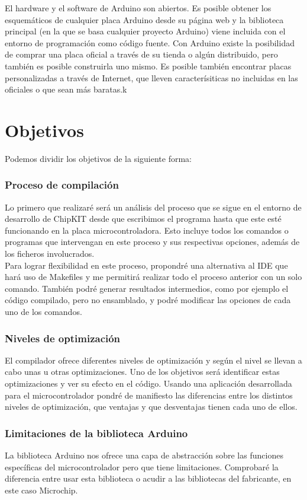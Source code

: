 El hardware y el software de Arduino son abiertos. Es posible obtener los esquemáticos de cualquier placa Arduino desde su página web y la biblioteca principal (en la que se basa cualquier proyecto Arduino) viene incluida con el entorno de programación como código fuente. Con Arduino existe la posibilidad de comprar una placa oficial a través de su tienda o algún distribuido, pero también es posible construirla uno mismo. Es posible también encontrar placas personalizadas a través de Internet, que lleven caracterísiticas no incluidas en las oficiales o que sean más baratas.k
\section{Objetivos}
Podemos dividir los objetivos de la siguiente forma:

\subsubsection{Proceso de compilación}
Lo primero que realizaré será un análisis del proceso que se sigue en el entorno de desarrollo de ChipKIT desde que escribimos el programa hasta que este esté funcionando en la placa microcontroladora.  Esto incluye todos los comandos o programas que intervengan en este proceso y sus respectivas opciones, además de los ficheros involucrados.\\
Para lograr flexibilidad en este proceso, propondré una alternativa al IDE que hará uso de Makefiles y me permitirá realizar todo el proceso anterior con un solo comando. También podré generar resultados intermedios, como por ejemplo el código compilado, pero no ensamblado, y podré modificar las opciones de cada uno de los comandos.

\subsubsection{Niveles de optimización}
El compilador ofrece diferentes niveles de optimización y según el nivel se llevan a cabo unas u otras optimizaciones. Uno de los objetivos será identificar estas optimizaciones y ver su efecto en el código. Usando una aplicación desarrollada para el microcontrolador pondré de manifiesto las diferencias entre los distintos niveles de optimización, que ventajas y que desventajas tienen cada uno de ellos.

\subsubsection{Limitaciones de la biblioteca Arduino}
La biblioteca Arduino nos ofrece una capa de abstracción sobre las funciones específicas del microcontrolador pero que tiene limitaciones. Comprobaré la diferencia entre usar esta biblioteca o acudir a las bibliotecas del fabricante, en este caso Microchip.

